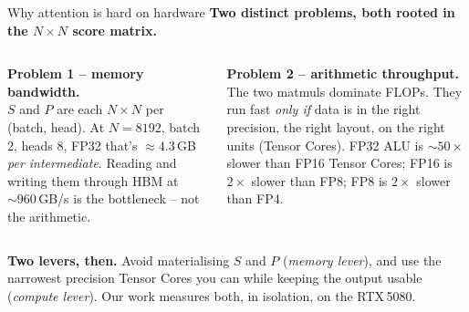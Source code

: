 \documentclass[10pt,aspectratio=169]{beamer}
\begin{document}
\begin{frame}{Why attention is hard on hardware}
  \textbf{Two distinct problems, both rooted in the $N{\times}N$ score matrix.}
  \vspace{0.3em}
  \begin{columns}[T]
      \begin{watchout}
        \textbf{Problem 1 -- memory bandwidth.}\\[2pt]
        $S$ and $P$ are each $N{\times}N$ per (batch, head). At
        $N = 8192$, batch $2$, heads $8$, FP32 that's
        $\approx 4.3$\,GB \emph{per intermediate}. Reading and writing
        them through HBM at $\sim 960$\,GB/s is the bottleneck -- not
        the arithmetic.
      \end{watchout}
      \begin{watchout}
        \textbf{Problem 2 -- arithmetic throughput.}\\[2pt]
        The two matmuls dominate FLOPs. They run fast \emph{only if}
        data is in the right precision, the right layout, on the right
        units (Tensor Cores). FP32 ALU is $\sim 50\times$ slower than
        FP16 Tensor Cores; FP16 is $2\times$ slower than FP8; FP8 is
        $2\times$ slower than FP4.
      \end{watchout}
  \end{columns}
  \vspace{0.5em}
  \begin{aha}
    \textbf{Two levers, then.} Avoid materialising $S$ and $P$
    (\emph{memory lever}), and use the narrowest precision Tensor Cores
    you can while keeping the output usable (\emph{compute lever}).
    Our work measures both, in isolation, on the RTX\,5080.
  \end{aha}
\end{frame}

{
\begin{frame}[plain]
\end{frame}
}
\end{document}
